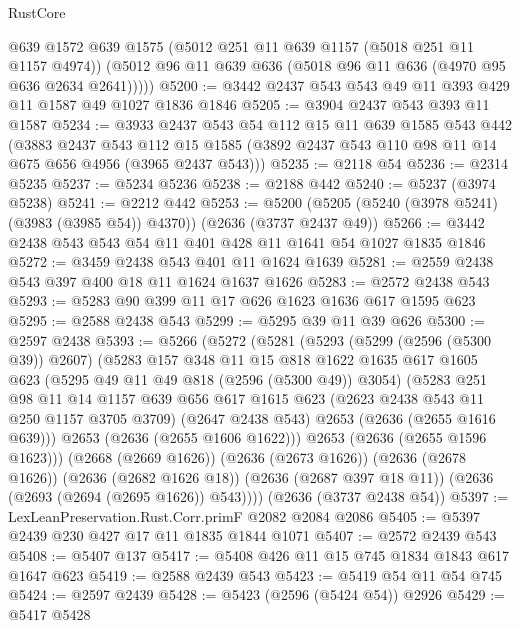 \begin{lexlean}{RustCore}
\begin{coremodule}
        @639
        @1572
        @639
        @1575
        (@5012 @251 @11 @639 @1157 (@5018 @251 @11 @1157 @4974))
        (@5012 @96 @11 @639 @636 (@5018 @96 @11 @636 (@4970 @95 @636 @2634 @2641)))))
@5200 := @3442 @2437 @543 @543 @49 @11 @393 @429 @11 @1587 @49 @1027 @1836 @1846
@5205 := @3904 @2437 @543 @393 @11 @1587
@5234 := @3933
    @2437
    @543
    @54
    @112
    @15
    @11
    @639
    @1585
    @543
    @442
    (@3883
      @2437
      @543
      @112
      @15
      @1585
      (@3892 @2437 @543 @110 @98 @11 @14 @675 @656 @4956 (@3965 @2437 @543)))
@5235 := @2118 @54
@5236 := @2314 @5235
@5237 := @5234 @5236
@5238 := @2188 @442
@5240 := @5237 (@3974 @5238)
@5241 := @2212 @442
@5253 := @5200 (@5205 (@5240 (@3978 @5241) (@3983 (@3985 @54)) @4370)) (@2636 (@3737 @2437 @49))
@5266 := @3442 @2438 @543 @543 @54 @11 @401 @428 @11 @1641 @54 @1027 @1835 @1846
@5272 := @3459 @2438 @543 @401 @11 @1624 @1639
@5281 := @2559 @2438 @543 @397 @400 @18 @11 @1624 @1637 @1626
@5283 := @2572 @2438 @543
@5293 := @5283 @90 @399 @11 @17 @626 @1623 @1636 @617 @1595 @623
@5295 := @2588 @2438 @543
@5299 := @5295 @39 @11 @39 @626
@5300 := @2597 @2438
@5393 := @5266
    (@5272
      (@5281
        (@5293
          (@5299 (@2596 (@5300 @39)) @2607)
          (@5283
            @157
            @348
            @11
            @15
            @818
            @1622
            @1635
            @617
            @1605
            @623
            (@5295 @49 @11 @49 @818 (@2596 (@5300 @49)) @3054)
            (@5283
              @251
              @98
              @11
              @14
              @1157
              @639
              @656
              @617
              @1615
              @623
              (@2623 @2438 @543 @11 @250 @1157 @3705 @3709)
              (@2647 @2438 @543)
              @2653
              (@2636 (@2655 @1616 @639)))
            @2653
            (@2636 (@2655 @1606 @1622)))
          @2653
          (@2636 (@2655 @1596 @1623)))
        (@2668 (@2669 @1626))
        (@2636 (@2673 @1626))
        (@2636 (@2678 @1626))
        (@2636 (@2682 @1626 @18))
        (@2636 (@2687 @397 @18 @11))
        (@2636 (@2693 (@2694 (@2695 @1626)) @543))))
    (@2636 (@3737 @2438 @54))
@5397 := LexLeanPreservation.Rust.Corr.primF @2082 @2084 @2086
@5405 := @5397 @2439 @230 @427 @17 @11 @1835 @1844 @1071
@5407 := @2572 @2439 @543
@5408 := @5407 @137
@5417 := @5408 @426 @11 @15 @745 @1834 @1843 @617 @1647 @623
@5419 := @2588 @2439 @543
@5423 := @5419 @54 @11 @54 @745
@5424 := @2597 @2439
@5428 := @5423 (@2596 (@5424 @54)) @2926
@5429 := @5417 @5428

\end{coremodule}
\end{lexlean}
